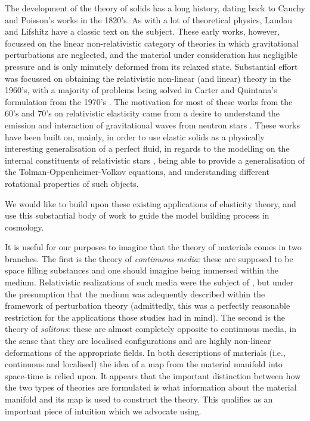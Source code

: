 The  development of the theory of solids has a long history, dating back to   Cauchy and Poisson's works in the 1820's. As with a lot of theoretical physics, Landau and Lifshitz have a classic text \cite{ll_elast} on the subject.  These early works, however, focussed on the linear non-relativistic category of theories in which gravitational perturbations are neglected, and the material under consideration has negligible pressure and is only minutely deformed from its relaxed state. Substantial effort was focussed on obtaining the relativistic non-linear (and linear) theory in the 1960's, with a majority of problems being solved in Carter and Quintana's formulation from the 1970's \cite{Carter21111972, Carter:1977qf}. The motivation for most of these  works from the 60's and 70's on relativistic elasticity came from a desire to understand the emission and interaction of gravitational waves from neutron stars \cite{Carter:1982xm}. These works have been built on, mainly, in order to use elastic solids as a physically interesting generalisation of a perfect fluid, in regards to the modelling on the internal constituents of relativistic stars \cite{Langlois11071998, Beig:2002pk, Karlovini:2002fc, Karlovini:2003xi, Karlovini:2004gq, Andersson:2005pf, Andersson:2006nr, Karlovini:2007ut, Frauendiener:2007yx, Brito:2009jj, Haskell:2012vp}, being able to provide a generalisation of the Tolman-Oppenheimer-Volkov equations, and understanding different rotational properties of such objects.

We would like to build upon these existing applications of elasticity theory, and use this substantial body of work to guide the model building process in cosmology.

It is useful for our purposes to imagine that the theory of materials comes in two branches. The first is the theory of   \textit{continuous media}: these are supposed to be space filling substances and one should imagine being immersed within the medium. Relativistic realizations of such media were the subject of \cite{Bucher:1998mh, Battye:2005ik, Battye:2007aa, Pearson:2014iaa}, but under the presumption that the medium was adequently described within the framework of perturbation theory (admittedly, this was a perfectly reasonable restriction for the applications those studies had in mind).  The second is the theory of \textit{solitons}: these are almost completely opposite to continuous media, in the sense that they are localised configurations and are highly non-linear deformations of the appropriate fields. In both descriptions of materials (i.e., continuous and localised) the idea of a map from the material manifold into space-time is relied upon. It appears that the important distinction between how the two types of theories are formulated is what information about the material manifold and its map is used to construct the theory. This qualifies as an important piece of intuition which we advocate using.




